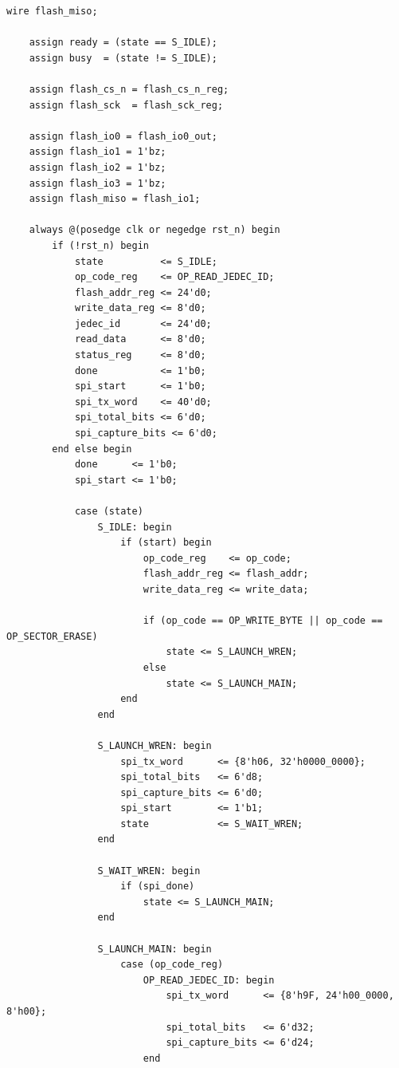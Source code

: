 \documentclass[a4paper,10pt]{article}
\begin{document}
\begin{lstlisting}[caption=w25q128_ctrl.v]
    wire flash_miso;

    assign ready = (state == S_IDLE);
    assign busy  = (state != S_IDLE);

    assign flash_cs_n = flash_cs_n_reg;
    assign flash_sck  = flash_sck_reg;

    assign flash_io0 = flash_io0_out;
    assign flash_io1 = 1'bz;
    assign flash_io2 = 1'bz;
    assign flash_io3 = 1'bz;
    assign flash_miso = flash_io1;

    always @(posedge clk or negedge rst_n) begin
        if (!rst_n) begin
            state          <= S_IDLE;
            op_code_reg    <= OP_READ_JEDEC_ID;
            flash_addr_reg <= 24'd0;
            write_data_reg <= 8'd0;
            jedec_id       <= 24'd0;
            read_data      <= 8'd0;
            status_reg     <= 8'd0;
            done           <= 1'b0;
            spi_start      <= 1'b0;
            spi_tx_word    <= 40'd0;
            spi_total_bits <= 6'd0;
            spi_capture_bits <= 6'd0;
        end else begin
            done      <= 1'b0;
            spi_start <= 1'b0;

            case (state)
                S_IDLE: begin
                    if (start) begin
                        op_code_reg    <= op_code;
                        flash_addr_reg <= flash_addr;
                        write_data_reg <= write_data;

                        if (op_code == OP_WRITE_BYTE || op_code == OP_SECTOR_ERASE)
                            state <= S_LAUNCH_WREN;
                        else
                            state <= S_LAUNCH_MAIN;
                    end
                end

                S_LAUNCH_WREN: begin
                    spi_tx_word      <= {8'h06, 32'h0000_0000};
                    spi_total_bits   <= 6'd8;
                    spi_capture_bits <= 6'd0;
                    spi_start        <= 1'b1;
                    state            <= S_WAIT_WREN;
                end

                S_WAIT_WREN: begin
                    if (spi_done)
                        state <= S_LAUNCH_MAIN;
                end

                S_LAUNCH_MAIN: begin
                    case (op_code_reg)
                        OP_READ_JEDEC_ID: begin
                            spi_tx_word      <= {8'h9F, 24'h00_0000, 8'h00};
                            spi_total_bits   <= 6'd32;
                            spi_capture_bits <= 6'd24;
                        end


\end{lstlisting}
\end{document}
